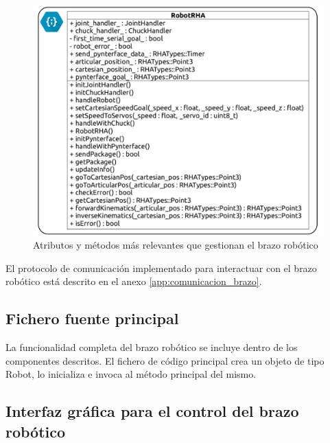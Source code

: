         \begin{figure}[H]
            	\centering
            	\includegraphics[width=\textwidth]{figuras/Imagenes_SW/class_diagram_RRHA.jpg}
            	\caption{Atributos y métodos más relevantes que gestionan el brazo robótico }
            	\label{fig:SW:class_diagram_RRHA}
        \end{figure}
                
        El protocolo de comunicación implementado para interactuar con el brazo robótico está descrito en el anexo \ref{app:comunicacion_brazo}.

    \subsection{Fichero fuente principal} \label{subsec:SW:maincpp}
        La funcionalidad completa del brazo robótico se incluye dentro de los componentes descritos. El fichero de código principal crea un objeto de tipo Robot, lo inicializa e invoca al método principal del mismo.
        
     \subsection{Interfaz gráfica para el control del brazo robótico}

